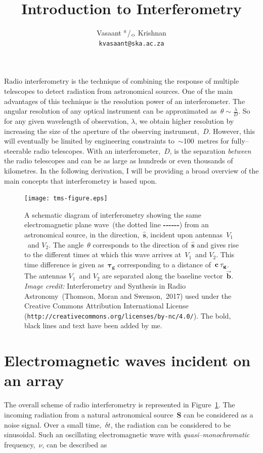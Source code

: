 \documentclass[11pt, a4paper]{article}
\title{\bf Introduction to Interferometry}
\author{Vasaant $^{\mbox{\tiny S}}$/$_{\mbox{\tiny O}}$ Krishnan\\
\texttt{kvasaant@ska.ac.za}}
\newcommand{\msp}{\mkern \medmuskip}
\begin{document}
\maketitle

Radio interferometry is the technique of combining the response of multiple telescopes to detect radiation from astronomical sources. One of the main advantages of this technique is the resolution power of an interferometer. The angular resolution of any optical instrument can be approximated as~$\theta \sim \frac{\lambda}{D}$. So for any given wavelength of observation, $\lambda $, we obtain higher resolution by increasing the size of the aperture of the observing instrument,~$D$. However, this will eventually be limited by engineering constraints to~$\sim $100~metres for fully--steerable radio telescopes. With an interferometer,~$D$, is the separation \emph{between} the radio telescopes and can be as large as hundreds or even thousands of kilometres. In the following derivation, I will be providing a broad overview of the main concepts that interferometry is based upon.

\begin{figure}
  \centering
    \texttt{[image: tms-figure.eps]}
  \caption[]{A schematic diagram of interferometry showing the same electromagnetic plane wave~(the dotted line \textbf{-}\textbf{-}\textbf{-}\textbf{-}\textbf{-}\textbf{-}) from an astronomical source, in the direction,~$\mathbf{\hat{s}}$, incident upon antennas~$V_1$~and $V_2$. The angle~$\theta $ corresponds to the direction of~$\mathbf{\hat{s}}$ and gives rise to the different times at which this wave arrives at~$V_1$~and $V_2$. This time difference is given as~$\mathbf{\tau _g}$ corresponding to a distance of~$\mathbf{c\msp \tau_ g}$. The antennas $V_1$~and $V_2$ are separated along the baseline vector~$\vec{\mathbf{b}}$.\\ \emph{Image credit:} Interferometry and Synthesis in Radio Astronomy~(Thomson, Moran and Swenson,~2017) used under the Creative Commons Attribution International License (\texttt{http://creativecommons.org/licenses/by-nc/4.0/}). The bold, black lines and text have been added by me.}
  \label{fig:tms-figure}
\end{figure}

\section{Electromagnetic waves incident on an array}
The overall scheme of radio interferometry is represented in Figure~\ref{fig:tms-figure}. The incoming radiation from a natural astronomical source~\textbf{S} can be considered as a noise signal. Over a small time,~$\delta t$, the radiation can be considered to be sinusoidal. Such an oscillating electromagnetic wave with \emph{quasi--monochromatic} frequency,~$\nu $, can be described as
\end{document}
